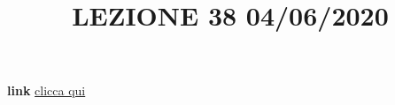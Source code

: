 \newline
\newline
\title{LEZIONE 38 04/06/2020}\newline
\textbf{link} \href{https://web.microsoftstream.com/video/ba67aae2-ae19-40e2-b383-a056e545f196?list=user&userId=faa91214-a6f5-40d7-8875-253fd49b8ce1}{clicca qui}
